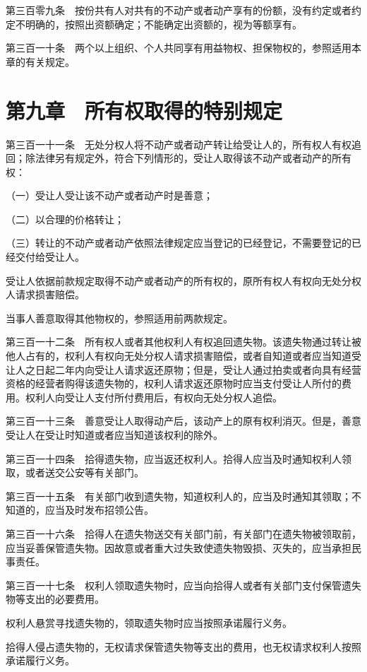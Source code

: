 \documentclass[UTF8,12pt,a4paper]{ctexbook}
\begin{document}
第三百零九条　按份共有人对共有的不动产或者动产享有的份额，没有约定或者约定不明确的，按照出资额确定；不能确定出资额的，视为等额享有。

第三百一十条　两个以上组织、个人共同享有用益物权、担保物权的，参照适用本章的有关规定。

\section*{第九章　所有权取得的特别规定}

第三百一十一条　无处分权人将不动产或者动产转让给受让人的，所有权人有权追回；除法律另有规定外，符合下列情形的，受让人取得该不动产或者动产的所有权：

（一）受让人受让该不动产或者动产时是善意；

（二）以合理的价格转让；

（三）转让的不动产或者动产依照法律规定应当登记的已经登记，不需要登记的已经交付给受让人。

受让人依据前款规定取得不动产或者动产的所有权的，原所有权人有权向无处分权人请求损害赔偿。

当事人善意取得其他物权的，参照适用前两款规定。

第三百一十二条　所有权人或者其他权利人有权追回遗失物。该遗失物通过转让被他人占有的，权利人有权向无处分权人请求损害赔偿，或者自知道或者应当知道受让人之日起二年内向受让人请求返还原物；但是，受让人通过拍卖或者向具有经营资格的经营者购得该遗失物的，权利人请求返还原物时应当支付受让人所付的费用。权利人向受让人支付所付费用后，有权向无处分权人追偿。

第三百一十三条　善意受让人取得动产后，该动产上的原有权利消灭。但是，善意受让人在受让时知道或者应当知道该权利的除外。

第三百一十四条　拾得遗失物，应当返还权利人。拾得人应当及时通知权利人领取，或者送交公安等有关部门。

第三百一十五条　有关部门收到遗失物，知道权利人的，应当及时通知其领取；不知道的，应当及时发布招领公告。

第三百一十六条　拾得人在遗失物送交有关部门前，有关部门在遗失物被领取前，应当妥善保管遗失物。因故意或者重大过失致使遗失物毁损、灭失的，应当承担民事责任。

第三百一十七条　权利人领取遗失物时，应当向拾得人或者有关部门支付保管遗失物等支出的必要费用。

权利人悬赏寻找遗失物的，领取遗失物时应当按照承诺履行义务。

拾得人侵占遗失物的，无权请求保管遗失物等支出的费用，也无权请求权利人按照承诺履行义务。
\end{document}
